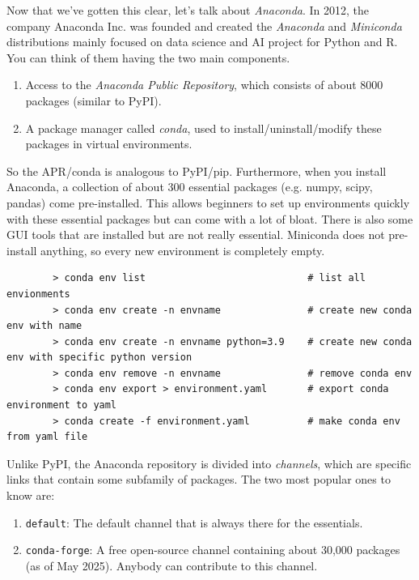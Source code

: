 \documentclass{article}
\begin{document}
    Now that we've gotten this clear, let's talk about \textit{Anaconda}. In 2012, the company Anaconda Inc. was founded and created the \textit{Anaconda} and \textit{Miniconda} distributions mainly focused on data science and AI project for Python and R. You can think of them having the two main components. 
    \begin{enumerate}
      \item Access to the \textit{Anaconda Public Repository}, which consists of about 8000 packages (similar to PyPI). 
      \item A package manager called \textit{conda}, used to install/uninstall/modify these packages in virtual environments. 
    \end{enumerate}
    So the APR/conda is analogous to PyPI/pip. Furthermore, when you install Anaconda, a collection of about 300 essential packages (e.g. numpy, scipy, pandas) come pre-installed. This allows beginners to set up environments quickly with these essential packages but can come with a lot of bloat. There is also some GUI tools that are installed but are not really essential. Miniconda does not pre-install anything, so every new environment is completely empty. 

    \begin{example}
      \begin{lstlisting}
        > conda env list                            # list all envionments
        > conda env create -n envname               # create new conda env with name 
        > conda env create -n envname python=3.9    # create new conda env with specific python version
        > conda env remove -n envname               # remove conda env
        > conda env export > environment.yaml       # export conda environment to yaml 
        > conda create -f environment.yaml          # make conda env from yaml file 
      \end{lstlisting}
    \end{example}

    Unlike PyPI, the Anaconda repository is divided into \textit{channels}, which are specific links that contain some subfamily of packages. The two most popular ones to know are: 
    \begin{enumerate}
      \item \texttt{default}: The default channel that is always there for the essentials. 
      \item \texttt{conda-forge}: A free open-source channel containing about 30,000 packages (as of May 2025). Anybody can contribute to this channel. 
    \end{enumerate} 
\end{document}
